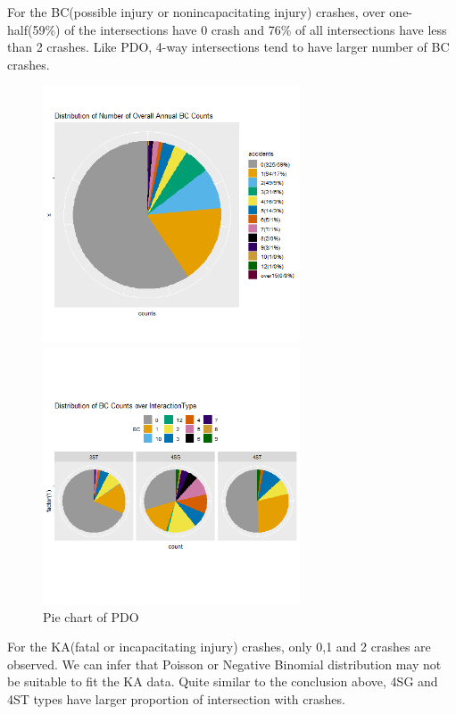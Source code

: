 \documentclass[11pt]{scrartcl} %
\begin{document}
For the BC(possible injury or nonincapacitating injury) crashes, over one-half(59\%) of the intersections have 0 crash and 76\% of all intersections have less than 2 crashes. Like PDO, 4-way intersections tend to have larger number of BC crashes.

\begin{figure}[H]
\begin{minipage}[t]{0.5\linewidth}
\centering
\includegraphics[width=3in]{image/p113.png}
\small
\end{minipage}
\begin{minipage}[t]{0.5\linewidth}
\centering
\includegraphics[width=3in]{image/p121_BC.png}
\small
\end{minipage}
\caption{Pie chart of PDO}
\end{figure}

For the KA(fatal or incapacitating injury) crashes, only 0,1 and 2 crashes are observed. We can infer that Poisson or Negative Binomial distribution may not be suitable to fit the KA data. Quite similar to the conclusion above, 4SG and 4ST types have larger proportion of intersection with crashes.
\end{document}
